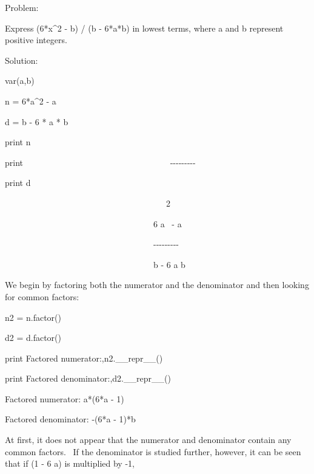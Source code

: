 \documentclass[12pt,twoside]{book}
\begin{document}
Problem:

Express (6*x\^{}2 {}- b) / (b {}- 6*a*b) in lowest terms, where a and b
represent positive integers.


\bigskip

Solution:

{\textquotedbl}{\textquotedbl}{\textquotedbl}


\bigskip

var({\textquotesingle}a,b{\textquotesingle})

n = 6*a\^{}2 {}- a

d = b {}- 6 * a * b

print n

print {\textquotedbl}
\ \ \ \ \ \ \ \ \ \ \ \ \ \ \ \ \ \ \ \ \ \ \ \ \ \ \ \ \ \ \ \ \ \ {}-{}-{}-{}-{}-{}-{}-{}-{}-{\textquotedbl}

print d

{\textbar}

\ \ \ \ \ \ \ \ \ \ \ \ \ \ \ \ \ \ \ \ \ \ \ \ \ \ \ \ \ \ \ \ \ \ \ \ \ \ 2

\ \ \ \ \ \ \ \ \ \ \ \ \ \ \ \ \ \ \ \ \ \ \ \ \ \ \ \ \ \ \ \ \ \ \ 6
a \ {}- a

\ \ \ \ \ \ \ \ \ \ \ \ \ \ \ \ \ \ \ \ \ \ \ \ \ \ \ \ \ \ \ \ \ \ \ {}-{}-{}-{}-{}-{}-{}-{}-{}-

\ \ \ \ \ \ \ \ \ \ \ \ \ \ \ \ \ \ \ \ \ \ \ \ \ \ \ \ \ \ \ \ \ \ \ b
{}- 6 a b


\bigskip

{\textquotedbl}{\textquotedbl}{\textquotedbl}

We begin by factoring both the numerator and the denominator and then
looking for common factors:

{\textquotedbl}{\textquotedbl}{\textquotedbl}

n2 = n.factor()

d2 = d.factor()

print {\textquotedbl}Factored
numerator:{\textquotedbl},n2.\_\_repr\_\_()

print {\textquotedbl}Factored
denominator:{\textquotedbl},d2.\_\_repr\_\_()

{\textbar}

Factored numerator: a*(6*a {}- 1)

Factored denominator: {}-(6*a {}- 1)*b


\bigskip

{\textquotedbl}{\textquotedbl}{\textquotedbl}

At first, it does not appear that the numerator and denominator contain
any common factors. \ If the denominator is studied further, however,
it can be seen that if (1 {}- 6 a) is multiplied by {}-1, 
\end{document}
